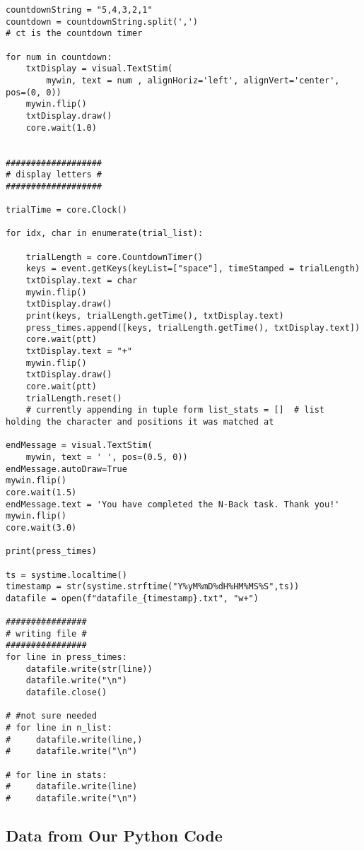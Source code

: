 \documentclass{article}
\begin{document}
\begin{verbatim}
countdownString = "5,4,3,2,1"
countdown = countdownString.split(',')
# ct is the countdown timer

for num in countdown:
    txtDisplay = visual.TextStim(
        mywin, text = num , alignHoriz='left', alignVert='center', pos=(0, 0))
    mywin.flip()
    txtDisplay.draw()
    core.wait(1.0)


###################
# display letters #
###################

trialTime = core.Clock()

for idx, char in enumerate(trial_list):

    trialLength = core.CountdownTimer()
    keys = event.getKeys(keyList=["space"], timeStamped = trialLength)
    txtDisplay.text = char
    mywin.flip()
    txtDisplay.draw()
    print(keys, trialLength.getTime(), txtDisplay.text)
    press_times.append([keys, trialLength.getTime(), txtDisplay.text])
    core.wait(ptt)
    txtDisplay.text = "+"
    mywin.flip()
    txtDisplay.draw()
    core.wait(ptt)
    trialLength.reset()
    # currently appending in tuple form list_stats = []  # list holding the character and positions it was matched at

endMessage = visual.TextStim(
    mywin, text = ' ', pos=(0.5, 0))
endMessage.autoDraw=True
mywin.flip()
core.wait(1.5)
endMessage.text = 'You have completed the N-Back task. Thank you!'
mywin.flip()
core.wait(3.0)

print(press_times)

ts = systime.localtime()
timestamp = str(systime.strftime("Y%yM%mD%dH%HM%MS%S",ts))
datafile = open(f"datafile_{timestamp}.txt", "w+")

################
# writing file #
################
for line in press_times:
    datafile.write(str(line))
    datafile.write("\n")
    datafile.close()

# #not sure needed
# for line in n_list:
#     datafile.write(line,)
#     datafile.write("\n")

# for line in stats:
#     datafile.write(line)
#     datafile.write("\n")

\end{verbatim}
\subsection{Data from Our Python Code}
\label{sec:org65fd546}
\end{document}
